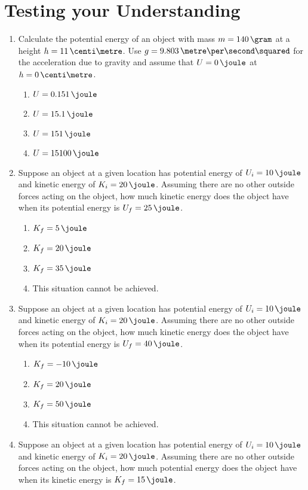 \section{Testing your Understanding}

\begin{enumerate}
\item Calculate the potential energy of an object with mass $m = 140\,\gram$ at a height $h = 11\,\centi\metre$. Use $g = 9.803\,\metre\per\second\squared$ for the acceleration due to gravity and assume that $U = 0\,\joule$ at $h = 0\,\centi\metre$.
  \begin{enumerate}
  \item $U = 0.151\,\joule$
  \item $U =  15.1\,\joule$
  \item $U =   151\,\joule$
  \item $U = 15100\,\joule$
  \end{enumerate}
\item Suppose an object at a given location has potential energy of $U_i = 10\,\joule$ and kinetic energy of $K_i = 20\,\joule$. Assuming there are no other outside forces acting on the object, how much kinetic energy does the object have when its potential energy is $U_f = 25\,\joule$.
  \begin{enumerate}
  \item $K_f =  5\,\joule$
  \item $K_f = 20\,\joule$
  \item $K_f = 35\,\joule$
  \item This situation cannot be achieved.
  \end{enumerate}
\item Suppose an object at a given location has potential energy of $U_i = 10\,\joule$ and kinetic energy of $K_i = 20\,\joule$. Assuming there are no other outside forces acting on the object, how much kinetic energy does the object have when its potential energy is $U_f = 40\,\joule$.
  \begin{enumerate}
  \item $K_f = -10\,\joule$
  \item $K_f =  20\,\joule$
  \item $K_f =  50\,\joule$
  \item This situation cannot be achieved.
  \end{enumerate}
\item Suppose an object at a given location has potential energy of $U_i = 10\,\joule$ and kinetic energy of $K_i = 20\,\joule$. Assuming there are no other outside forces acting on the object, how much potential energy does the object have when its kinetic energy is $K_f = 15\,\joule$.

\end{enumerate}

